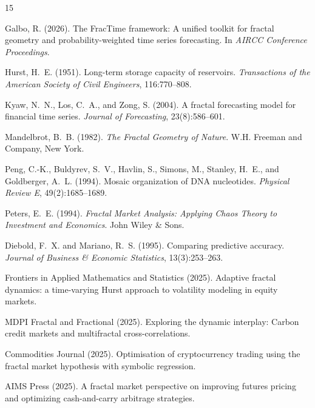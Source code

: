 \documentclass[12pt,a4paper]{article}
\begin{document}
\begin{thebibliography}{15}

Galbo, R. (2026).
\newblock The {FracTime} framework: A unified toolkit for fractal geometry and
  probability-weighted time series forecasting.
\newblock In \emph{AIRCC Conference Proceedings}.

Hurst, H.~E. (1951).
\newblock Long-term storage capacity of reservoirs.
\newblock \emph{Transactions of the American Society of Civil Engineers},
  116:770--808.

Kyaw, N.~N., Los, C.~A., and Zong, S. (2004).
\newblock A fractal forecasting model for financial time series.
\newblock \emph{Journal of Forecasting}, 23(8):586--601.

Mandelbrot, B.~B. (1982).
\newblock \emph{The Fractal Geometry of Nature}.
\newblock W.H. Freeman and Company, New York.

Peng, C.-K., Buldyrev, S.~V., Havlin, S., Simons, M., Stanley, H.~E., and
  Goldberger, A.~L. (1994).
\newblock Mosaic organization of {DNA} nucleotides.
\newblock \emph{Physical Review E}, 49(2):1685--1689.

Peters, E.~E. (1994).
\newblock \emph{Fractal Market Analysis: Applying Chaos Theory to Investment
  and Economics}.
\newblock John Wiley \& Sons.

Diebold, F.~X. and Mariano, R.~S. (1995).
\newblock Comparing predictive accuracy.
\newblock \emph{Journal of Business \& Economic Statistics}, 13(3):253--263.

Frontiers in Applied Mathematics and Statistics (2025).
\newblock Adaptive fractal dynamics: a time-varying {Hurst} approach to
  volatility modeling in equity markets.

MDPI Fractal and Fractional (2025).
\newblock Exploring the dynamic interplay: Carbon credit markets and
  multifractal cross-correlations.

Commodities Journal (2025).
\newblock Optimisation of cryptocurrency trading using the fractal market
  hypothesis with symbolic regression.

AIMS Press (2025).
\newblock A fractal market perspective on improving futures pricing and
  optimizing cash-and-carry arbitrage strategies.


\end{thebibliography}
\end{document}
